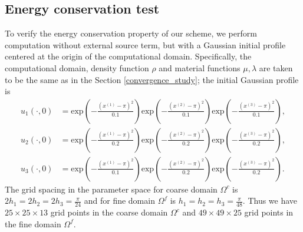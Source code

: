 \subsection{Energy conservation test}\label{conserved_energy}
To verify the energy conservation property of our scheme, we perform computation without external source term, but with a Gaussian initial profile  centered at the origin of the computational domain.  Specifically, the computational domain, density function $\rho$ and material functions $\mu, \lambda$ are taken to be the same as in the Section \ref{convergence_study}; the initial Gaussian profile is
\begin{align*}
	u_1(\cdot,0) &= \mbox{exp}\left(-\frac{(x^{(1)}-\pi)^2}{0.1}\right)\mbox{exp}\left(-\frac{(x^{(2)}-\pi)^2}{0.1}\right)\mbox{exp}\left(-\frac{(x^{(3)}-\pi)^2}{0.1}\right),\\
	u_2(\cdot,0) &= \mbox{exp}\left(-\frac{(x^{(1)}-\pi)^2}{0.2}\right)\mbox{exp}\left(-\frac{(x^{(2)}-\pi)^2}{0.2}\right)\mbox{exp}\left(-\frac{(x^{(3)}-\pi)^2}{0.2}\right),\\
	u_3(\cdot,0) &= \mbox{exp}\left(-\frac{(x^{(1)}-\pi)^2}{0.1}\right)\mbox{exp}\left(-\frac{(x^{(2)}-\pi)^2}{0.2}\right)\mbox{exp}\left(-\frac{(x^{(3)}-\pi)^2}{0.2}\right).
\end{align*}
 The grid spacing in the parameter space for coarse domain $\Omega^c$ is $2h_1 = 2h_2 = 2h_3 = \frac{\pi}{24}$ and for fine domain $\Omega^f$ is $h_1 = h_2 = h_3 = \frac{\pi}{48}$. Thus we have $25\times25\times13$ grid points in the coarse domain $\Omega^c$ and $49\times49\times25$ grid points in the fine domain $\Omega^f$. 

